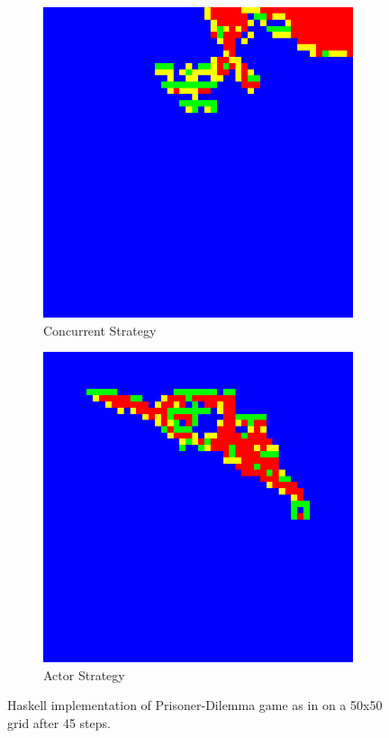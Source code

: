 \begin{figure}
\begin{subfigure}[b]{0.475\textwidth}
            \centering 
            \includegraphics[width=.4\textwidth, angle=0]{./fig/con_50x50_45steps_MSG_haskell.png}
            \caption[]%
            {{\small Concurrent Strategy}}    
            \label{fig:con_strat}
        \end{subfigure}
        \quad
        \begin{subfigure}[b]{0.475\textwidth}   
            \centering 
            \includegraphics[width=.4\textwidth, angle=0]{./fig/act_50x50_45steps_MSG_haskell.png}
            \caption[]%
            {{\small Actor Strategy}}    
            \label{fig:act_strat}
        \end{subfigure}
        \caption[]
        {\small Haskell implementation of Prisoner-Dilemma game as in \cite{huberman_evolutionary_1993} on a 50x50 grid after 45 steps.} 
        \label{fig:prisoner_strategies}
    \end{figure}
    
